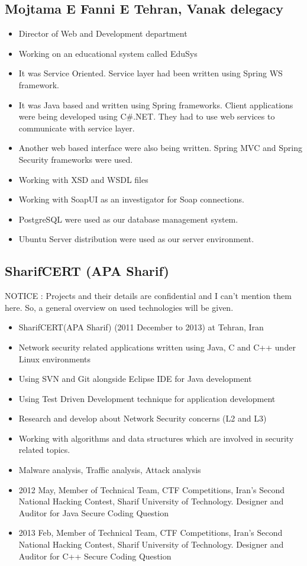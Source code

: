 \documentclass[12pt,a4paper]{article}
\begin{document}
    \subsection{Mojtama E Fanni E Tehran, Vanak delegacy}
    	\begin{itemize}
    	    \item Director of Web and Development department
    		\item Working on an educational system called EduSys
    		\item It was Service Oriented. Service layer had been written using Spring WS framework.
    		\item It was Java based and written using Spring frameworks. Client applications were being developed using C\#.NET. They had to use web services to communicate with service layer.
    		\item Another web based interface were also being written. Spring MVC and Spring Security frameworks were used.
    		\item Working with XSD and WSDL files
    		\item Working with SoapUI as an investigator for Soap connections.
			\item PostgreSQL were used as our database management system.
			\item Ubuntu Server distribution were used as our server environment.
    	\end{itemize}
    	
	\subsection{SharifCERT (APA Sharif)}
		 NOTICE : Projects and their details are confidential and I can't mention them here. So, a general overview on used technologies will be given.
		\begin{itemize}
			\item SharifCERT(APA Sharif) (2011 December to 2013) at Tehran, Iran
			\item Network security related applications written using Java, C and C++ under Linux environments
			\item Using SVN and Git alongside Eclipse IDE for Java development
			\item Using Test Driven Development technique for application development
			\item Research and develop about Network Security concerns (L2 and L3)
			\item Working with algorithms and data structures which are involved in security related topics.
			\item Malware analysis, Traffic analysis, Attack analysis
			\item 2012 May, Member of Technical Team, CTF Competitions, Iran's Second National Hacking Contest, Sharif University of Technology. Designer and Auditor for Java Secure Coding Question
			\item 2013 Feb, Member of Technical Team, CTF Competitions, Iran's Second National Hacking Contest, Sharif University of Technology. Designer and Auditor for C++ Secure Coding Question
		\end{itemize}
		
\end{document}
